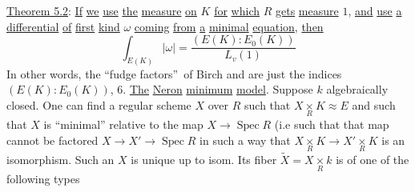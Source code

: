 \uline{Theorem 5.2}: \uline{If} \uline{we} \uline{use} \uline{the} \uline{measure} \uline{on} $K$ \uline{for} \uline{which} $R$ \uline{gets} \uline{measure} $1$, \uline{and} \uline{use} \uline{a} \uline{differential} \uline{of} \uline{first} \uline{kind} $\omega$ \uline{coming} \uline{from} \uline{a} \uline{minimal} \uline{equation}, \uline{then}
\[
\int_{E(K)}|\omega|=\frac{(E(K):E_0(K))}{L_v(1)}
\tag*{(5.3)}
\]
In other words, the ``fudge factors''\ of Birch and  are just the indices $(E(K):E_0(K))$,
\clearpage
{}
6. \uline{The} \uline{Neron} \uline{minimum} \uline{model}. Suppose $k$ algebraically closed. One can find a regular scheme $X$ over $R$ such that $X\underset{R}{\times}K\approx E$ and such that $X$ is ``minimal'' relative to the map $X\longrightarrow\operatorname{Spec} R$ (i.e such that that map cannot be factored $X\longrightarrow X'\longrightarrow\operatorname{Spec} R$ in such a way that $X\underset{R}{\times}K\to X'\underset{R}{\times}K$ is an isomorphism. Such an $X$ is unique up to isom. Its fiber $\widetilde X=X\underset{R}{\times}k$ is of one of the following types

